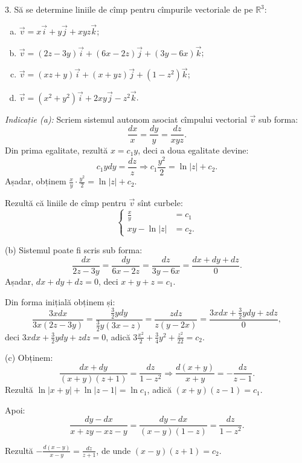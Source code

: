 \documentclass[11pt,a4paper]{article}
\newcommand\RR{\mathbb{R}}
\theoremstyle{dotless}
\theoremstyle{dotlessdr}
\begin{document}
\vspace{1cm}

3. Să se determine liniile de cîmp pentru cîmpurile vectoriale de pe $\RR^3$:
\begin{enumerate}[(a)]
\item $\vec{v} = x\vec{i} + y \vec{j} + xyz \vec{k}$;
\item $\vec{v} = (2z - 3y)\vec{i} + (6x - 2z)\vec{j} + (3y - 6x)\vec{k}$;
\item $\vec{v} = (xz + y) \vec{i} + (x + yz) \vec{j} + (1 - z^2)\vec{k}$;
\item $\vec{v} = (x^2 + y^2)\vec{i} + 2xy \vec{j} - z^2 \vec{k}$.
\end{enumerate}

\emph{Indicație (a):} Scriem sistemul autonom asociat cîmpului vectorial $\vec{v}$
sub forma:
\[
  \frac{dx}{x} = \frac{dy}{y} = \frac{dz}{xyz}.
\]
Din prima egalitate, rezultă $x = c_1 y$, deci a doua egalitate devine:
\[
  c_1 ydy = \frac{dz}{z} \Rightarrow c_1 \frac{y^2}{2} = \ln |z| + c_2.
\]
Așadar, obținem $\frac{x}{y} \cdot \frac{y^2}{2} = \ln |z| + c_2$.

Rezultă că liniile de cîmp pentru $\vec{v}$ sînt curbele:
\[
  \begin{cases}
    \frac{x}{y} &= c_1 \\
    xy - \ln|z| &= c_2.
  \end{cases}
\]

\vspace{1cm}

(b) Sistemul poate fi scris sub forma:
\[
  \frac{dx}{2z - 3y} = \frac{dy}{6x - 2z} = \frac{dz}{3y-6x} = \frac{dx + dy + dz}{0}.
\]
Așadar, $dx + dy + dz = 0$, deci $x + y + z = c_1$.

Din forma inițială obținem și:
\[
  \frac{3xdx}{3x(2z - 3y)} = \frac{\frac{3}{2}ydy}{\frac{3}{2}y(3x - z)} = \frac{zdz}{z(y - 2x)} = %
  \frac{3xdx + \frac{3}{2}ydy + zdz}{0},
\]
deci $3xdx + \frac{3}{2}ydy + zdz = 0$, adică
$3\frac{x^2}{2} + \frac{3}{4}y^2 + \frac{z^2}{22} = c_2$.

\vspace{1cm}

(c) Obținem:
\[
  \frac{dx + dy}{(x + y)(z + 1)} = \frac{dz}{1 - z^2} \Rightarrow %
  \frac{d(x + y)}{x + y} = -\frac{dz}{z - 1}.
\]
Rezultă $\ln|x + y| + \ln|z - 1| = \ln c_1$, adică $(x + y)(z - 1) = c_1$.

Apoi:
\[
  \frac{dy - dx}{x + zy - xz - y} = \frac{dy - dx}{(x - y)(1 - z)} = \frac{dz}{1 - z^2}.
\]

Rezultă $-\frac{d(x - y)}{x - y} = \frac{dz}{z + 1}$, de unde $(x - y)(z + 1) = c_2$.
\end{document}

